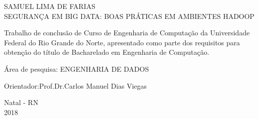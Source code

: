 \begin{titlepage}
\vfill
\begin{center}

    {\large SAMUEL LIMA DE FARIAS\\}
    \vspace{2cm}
    {\Large \textsc{SEGURANÇA EM BIG DATA: BOAS PRÁTICAS EM AMBIENTES HADOOP}\\}
    \vspace{1cm}
    \hspace{.45\linewidth}
    \begin{minipage}{.50\linewidth}

            Trabalho de conclusão de Curso de Engenharia de Computação da Universidade Federal do Rio Grande do Norte, apresentado como parte dos requisitos para obtenção do título de Bacharelado em Engenharia de Computação.

            \vspace{0.5 cm}

            Área de pesquisa: ENGENHARIA DE DADOS

            \vspace{0.5 cm}

            Orientador:Prof.Dr.Carlos Manuel Dias Viegas
    
    \end{minipage}

    \vspace{2cm}
    \vfill
    {\large Natal - RN\\ 2018}
\end{center}

\end{titlepage}